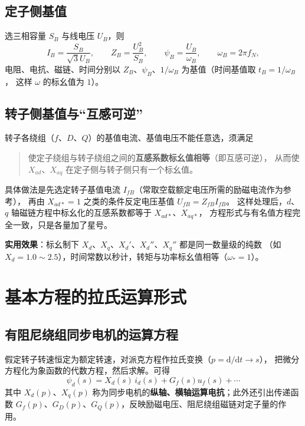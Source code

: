 \subsection{定子侧基值}

选三相容量 $S_B$ 与线电压 $U_B$，则
\begin{equation}
  I_B=\frac{S_B}{\sqrt{3}U_B},\qquad Z_B=\frac{U_B^{2}}{S_B},\qquad
  \psi_B=\frac{U_B}{\omega_B},\qquad \omega_B=2\pi f_N,
\end{equation}
电阻、电抗、磁链、时间分别以 $Z_B$、$\psi_B$、$1/\omega_B$ 为基值（时间基值取 $t_B=1/\omega_B$，
这样 $\omega$ 的标幺值为 $1$）。

\subsection{转子侧基值与“互感可逆”}

转子各绕组（$f$、$D$、$Q$）的基值电流、基值电压不能任意选，须满足
\begin{quote}
  使定子绕组与转子绕组之间的\textbf{互感系数标幺值相等}（即互感可逆），
  从而使 $X_{ad}$、$X_{aq}$ 在定子侧与转子侧只有一个标幺值。
\end{quote}
具体做法是先选定转子基值电流 $I_{fB}$（常取空载额定电压所需的励磁电流作为参考），
再由 $X_{ad*}=1$ 之类的条件反定电压基值 $U_{fB}=Z_{fB}I_{fB}$。
这样处理后，$d$、$q$ 轴磁链方程中标幺化的互感系数都等于 $X_{ad*}$、$X_{aq*}$，
方程形式与有名值方程完全一致，只是各量加了星号。

\textbf{实用效果}：标幺制下 $X_d$、$X_q$、$X_d'$、$X_d''$、$X_q''$ 都是同一数量级的纯数
（如 $X_d=1.0\sim2.5$），时间常数以秒计，转矩与功率标幺值相等（$\omega_*=1$）。

\section{基本方程的拉氏运算形式}

\subsection{有阻尼绕组同步电机的运算方程}

假定转子转速恒定为额定转速，对派克方程作拉氏变换（$p=\mathrm{d}/\mathrm{d}t\to s$），
把微分方程化为象函数的代数方程，然后求解。可得
\begin{equation}
  \psi_d(s)=X_d(s)\,i_d(s)+G_f(s)u_f(s)+\cdots
\end{equation}
其中
$X_d(p)$、$X_q(p)$ 称为同步电机的\textbf{纵轴、横轴运算电抗}；此外还引出传递函数
$G_f(p)$、$G_D(p)$、$G_Q(p)$，反映励磁电压、阻尼绕组磁链对定子量的作用。


